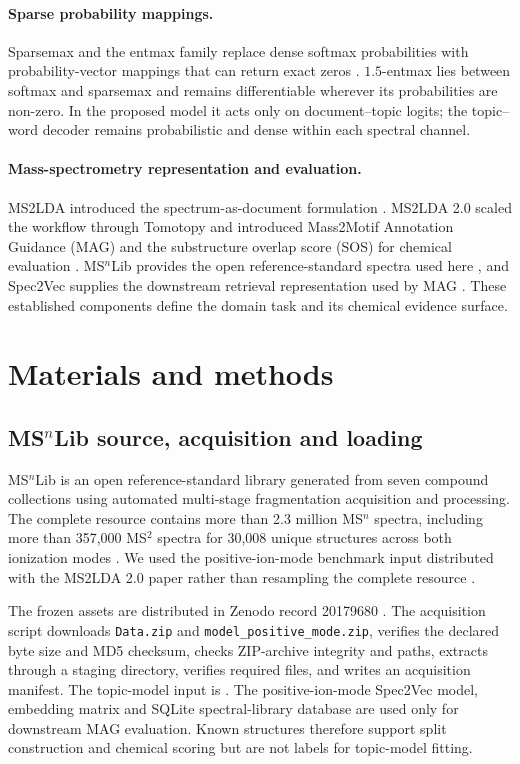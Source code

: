 \documentclass[10pt,a4paper]{article}
\begin{document}
\paragraph{Sparse probability mappings.}
Sparsemax and the entmax family replace dense softmax probabilities with
probability-vector mappings that can return exact zeros
\cite{martins2016,peters2019}. $1.5$-entmax lies between softmax and sparsemax
and remains differentiable wherever its probabilities are non-zero. In the
proposed model it acts only on document--topic logits; the
topic--word decoder remains probabilistic and dense within each spectral
channel.

\paragraph{Mass-spectrometry representation and evaluation.}
MS2LDA introduced the spectrum-as-document formulation
\cite{vanderhooft2016}. MS2LDA 2.0 scaled the workflow through Tomotopy and
introduced Mass2Motif Annotation Guidance (MAG) and the substructure overlap
score (SOS) for chemical evaluation \cite{torresortega2026}. MS$^{n}$Lib
provides the open reference-standard spectra used here \cite{brungs2025}, and
Spec2Vec supplies the downstream retrieval representation used by MAG
\cite{huber2021}. These established components define the domain task and its
chemical evidence surface.

\section{Materials and methods}

\subsection{MS\texorpdfstring{$^{n}$}{n}Lib source, acquisition and loading}

MS$^{n}$Lib is an open reference-standard library generated from seven compound
collections using automated multi-stage fragmentation acquisition and
processing. The complete resource contains more than 2.3 million MS$^{n}$
spectra, including more than 357,000 MS$^{2}$ spectra for 30,008 unique
structures across both ionization modes \cite{brungs2025}. We used the
positive-ion-mode benchmark input distributed with the MS2LDA 2.0 paper rather than
resampling the complete resource \cite{torresortega2026}.

The frozen assets are distributed in Zenodo record 20179680
\cite{msnlibdata}. The acquisition script downloads \texttt{Data.zip} and
\texttt{model\_positive\_mode.zip}, verifies the declared byte size and MD5
checksum, checks ZIP-archive integrity and paths, extracts through a staging
directory, verifies required files, and writes an acquisition manifest. The topic-model input is
. The
positive-ion-mode Spec2Vec model, embedding matrix and SQLite spectral-library
database are used only for downstream MAG evaluation. Known structures
therefore support split construction and chemical scoring but are not labels
for topic-model fitting.
\end{document}
